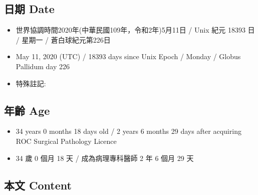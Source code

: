 \documentclass[a5paper, 12pt
]{book}
\providecommand{\tightlist}{%
  \setlength{\itemsep}{0pt}\setlength{\parskip}{0pt}}
\begin{document}
\hypertarget{ux65e5ux671f-date-71}{%
\subsection{日期 Date}\label{ux65e5ux671f-date-71}}

\begin{itemize}
\tightlist
\item
  世界協調時間2020年(中華民國109年，令和2年)5月11日 / Unix 紀元 18393 日
  / 星期一 / 蒼白球紀元第226日
\item
  May 11, 2020 (UTC) / 18393 days since Unix Epoch / Monday / Globus
  Pallidum day 226
\item
  特殊註記:
\end{itemize}

\hypertarget{ux5e74ux9f61-age-71}{%
\subsection{年齡 Age}\label{ux5e74ux9f61-age-71}}

\begin{itemize}
\tightlist
\item
  34 years 0 months 18 days old / 2 years 6 months 29 days after
  acquiring ROC Surgical Pathology Licence
\item
  34 歲 0 個月 18 天 / 成為病理專科醫師 2 年 6 個月 29 天
\end{itemize}

\hypertarget{ux672cux6587-content-71}{%
\subsection{本文 Content}\label{ux672cux6587-content-71}}
\end{document}
